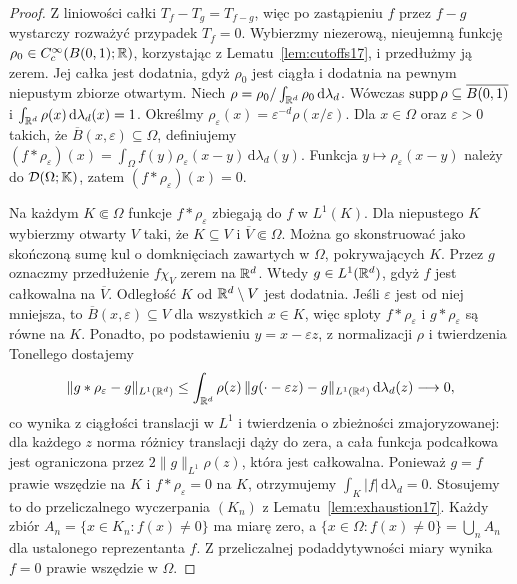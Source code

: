 \begin{proof}
Z liniowości całki $T_f-T_g=T_{f-g}$, więc po zastąpieniu
$f$ przez $f-g$ wystarczy rozważyć przypadek $T_f=0$.
Wybierzmy niezerową, nieujemną funkcję
$\rho_0\in C_c^\infty(B(0,1);\mathbb R)$, korzystając
z Lematu~\ref{lem:cutoffs17}, i przedłużmy ją zerem.
Jej całka jest dodatnia, gdyż $\rho_0$ jest ciągła
i dodatnia na pewnym niepustym zbiorze otwartym.
Niech $\rho=\rho_0/\int_{\mathbb R^d}\rho_0\,\mathrm d\lambda_d$.
Wówczas $\operatorname{supp}\rho\subseteq\overline{B(0,1)}$ i
$\int_{\mathbb R^d}\rho(x)\,\mathrm d\lambda_d(x)=1$. Określmy
$\rho_\varepsilon(x)=\varepsilon^{-d}\rho(x/\varepsilon)$.
Dla $x\in\Omega$ oraz $\varepsilon>0$ takich, że
$\overline B(x,\varepsilon)\subseteq\Omega$, definiujemy
$(f*\rho_\varepsilon)(x)=\int_\Omega f(y)\rho_\varepsilon(x-y)
\,\mathrm d\lambda_d(y)$.
Funkcja $y\mapsto\rho_\varepsilon(x-y)$ należy do
$\mathcal D(\Omega;\mathbb K)$, zatem
$(f*\rho_\varepsilon)(x)=0$.

Na każdym $K\Subset\Omega$ funkcje
$f*\rho_\varepsilon$ zbiegają do $f$ w $L^1(K)$.
Dla niepustego $K$ wybierzmy otwarty $V$ taki, że
$K\subseteq V$ i $\overline V\Subset\Omega$.
Można go skonstruować jako skończoną sumę kul o domknięciach
zawartych w $\Omega$, pokrywających $K$.
Przez $g$ oznaczmy przedłużenie $f\chi_V$ zerem na $\mathbb R^d$.
Wtedy $g\in L^1(\mathbb R^d)$, gdyż $f$ jest całkowalna na
$\overline V$. Odległość $K$ od $\mathbb R^d\setminus V$ jest dodatnia.
Jeśli $\varepsilon$ jest od niej mniejsza, to
$\overline B(x,\varepsilon)\subseteq V$ dla wszystkich $x\in K$,
więc sploty $f*\rho_\varepsilon$ i $g*\rho_\varepsilon$
są równe na $K$. Ponadto, po podstawieniu $y=x-\varepsilon z$,
z normalizacji $\rho$ i twierdzenia Tonellego dostajemy
\[\|g*\rho_\varepsilon-g\|_{L^1(\mathbb R^d)}\le
\int_{\mathbb R^d}\rho(z)\,
\|g(\cdot-\varepsilon z)-g\|_{L^1(\mathbb R^d)}\,
\mathrm d\lambda_d(z)\longrightarrow0,\]
co wynika z ciągłości translacji w $L^1$ i twierdzenia
o zbieżności zmajoryzowanej: dla każdego $z$
norma różnicy translacji dąży do zera, a cała funkcja
podcałkowa jest ograniczona przez
$2\|g\|_{L^1}\rho(z)$, która jest całkowalna.
Ponieważ $g=f$ prawie wszędzie na $K$ i
$f*\rho_\varepsilon=0$ na $K$, otrzymujemy
$\int_K|f|\,\mathrm d\lambda_d=0$.
Stosujemy to do przeliczalnego wyczerpania $(K_n)$
z Lematu~\ref{lem:exhaustion17}. Każdy zbiór
$A_n=\{x\in K_n:f(x)\ne0\}$ ma miarę zero,
a $\{x\in\Omega:f(x)\ne0\}=\bigcup_n A_n$ dla ustalonego
reprezentanta $f$. Z przeliczalnej podaddytywności miary
wynika $f=0$ prawie wszędzie w $\Omega$.
\end{proof}


